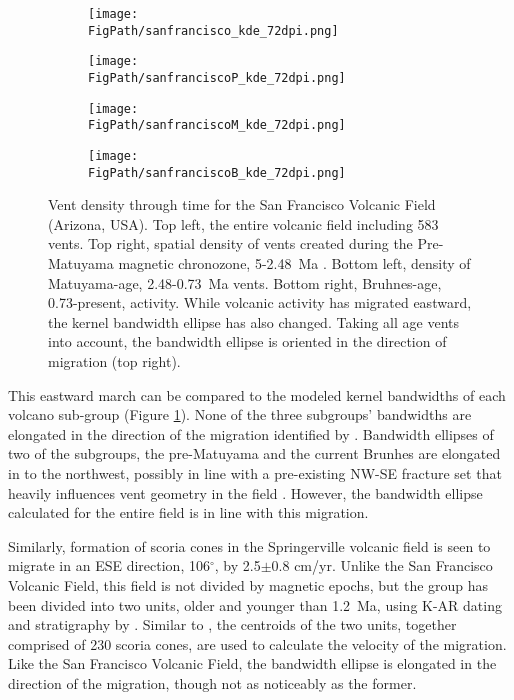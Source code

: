 \begin{figure}
\centering
\begin{subfigure}{0.49\textwidth}
\centering
\texttt{[image: \\FigPath/sanfrancisco\_kde\_72dpi.png]}
\end{subfigure}
\begin{subfigure}{0.49\textwidth}
\centering
\texttt{[image: \\FigPath/sanfranciscoP\_kde\_72dpi.png]}
\end{subfigure}
\begin{subfigure}{0.49\textwidth}
\centering
\texttt{[image: \\FigPath/sanfranciscoM\_kde\_72dpi.png]}
\end{subfigure}
\begin{subfigure}{0.49\textwidth}
\centering
\texttt{[image: \\FigPath/sanfranciscoB\_kde\_72dpi.png]}
\end{subfigure}
\caption[Vent density through time for the San Francisco Volcanic Field (Arizona, USA)]{Vent density through time for the San Francisco Volcanic Field (Arizona, USA). Top left, the entire volcanic field including 583 vents. Top right, spatial density of vents created during the Pre-Matuyama magnetic chronozone, 5-2.48~Ma \citep{tanaka1986migration}. Bottom left, density of Matuyama-age, 2.48-0.73~Ma vents. Bottom right, Bruhnes-age, 0.73-present, activity. While volcanic activity has migrated eastward, the kernel bandwidth ellipse has also changed. Taking all age vents into account, the bandwidth ellipse is oriented in the direction of migration (top right).}
\label{fig_sfvfkde}
\end{figure}

This eastward march can be compared to the modeled kernel bandwidths of each volcano sub-group (Figure \ref{fig_sfvfkde}). None of the three subgroups' bandwidths are elongated in the direction of the migration identified by \citet{tanaka1986migration}. Bandwidth ellipses of two of the subgroups, the pre-Matuyama and the current Brunhes are elongated in to the northwest, possibly in line with a pre-existing NW-SE fracture set that heavily influences vent geometry  in the field \citep{marshall2015subsurface}. However, the bandwidth ellipse calculated for the entire field is in line with this migration.

Similarly, formation of scoria cones in the Springerville volcanic field is seen to migrate in an ESE direction, 106$^{\circ}$, by 2.5$\pm$0.8 cm/yr. Unlike the San Francisco Volcanic Field, this field is not divided by magnetic epochs, but the group has been divided into two units, older and younger than 1.2~Ma, using K-AR dating and stratigraphy by \citet{condit1989patterns}. Similar to \citet{tanaka1986migration}, the centroids of the two units, together comprised of 230 scoria cones, are used to calculate the velocity of the migration. Like the San Francisco Volcanic Field, the bandwidth ellipse is elongated in the direction of the migration, though not as noticeably as the former.

